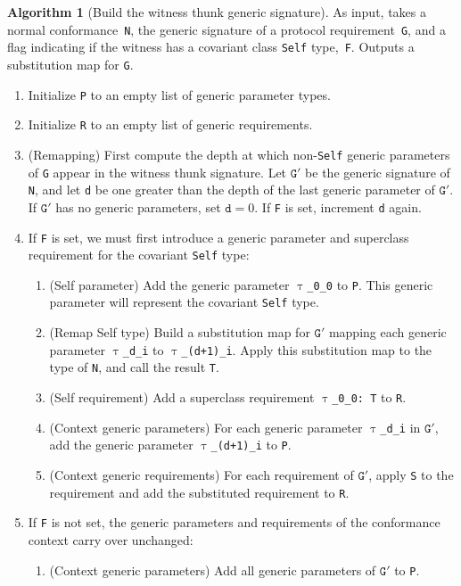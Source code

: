\documentclass[a4paper,headsepline,bibliography=totoc,toc=flat,fleqn,twoside=semi]{scrbook}
\theoremstyle{definition}
\theoremstyle{definition}
\theoremstyle{definition}
\newtheorem{algorithm}{Algorithm}[chapter]
\newcommand{\ttgp}[2]{\texttt{$\uptau$\_#1\_#2}}
\begin{document}
\begin{algorithm}[Build the witness thunk generic signature] As input, takes a normal conformance~\texttt{N}, the generic signature of a protocol requirement~\texttt{G}, and a flag indicating if the witness has a covariant class \texttt{Self} type,~\texttt{F}. Outputs a substitution map for \texttt{G}.
\begin{enumerate}
\item Initialize \texttt{P} to an empty list of generic parameter types.
\item Initialize \texttt{R} to an empty list of generic requirements.
\item (Remapping) First compute the depth at which non-\texttt{Self} generic parameters of \texttt{G} appear in the witness thunk signature. Let $\texttt{G}'$ be the generic signature of \texttt{N}, and let \texttt{d} be one greater than the depth of the last generic parameter of $\texttt{G}'$. If $\texttt{G}'$ has no generic parameters, set $\texttt{d}=0$. If \texttt{F} is set, increment \texttt{d} again.
\item If \texttt{F} is set, we must first introduce a generic parameter and superclass requirement for the covariant \texttt{Self} type:
\begin{enumerate}
\item (Self parameter) Add the generic parameter \ttgp{0}{0} to \texttt{P}. This generic parameter will represent the covariant \texttt{Self} type.
\item (Remap Self type) Build a substitution map for $\texttt{G}'$ mapping each generic parameter \ttgp{d}{i} to \ttgp{(d+1)}{i}. Apply this substitution map to the type of \texttt{N}, and call the result \texttt{T}.
\item (Self requirement) Add a superclass requirement \texttt{\ttgp{0}{0}:\ T} to \texttt{R}.
\item (Context generic parameters) For each generic parameter \ttgp{d}{i} in $\texttt{G}'$, add the generic parameter \ttgp{(d+1)}{i} to \texttt{P}.
\item (Context generic requirements) For each requirement of $\texttt{G}'$, apply \texttt{S} to the requirement and add the substituted requirement to \texttt{R}.
\end{enumerate}
\item If \texttt{F} is not set, the generic parameters and requirements of the conformance context carry over unchanged:
\begin{enumerate}
\item (Context generic parameters) Add all generic parameters of $\texttt{G}'$ to \texttt{P}.

\end{enumerate}
\end{enumerate}
\end{algorithm}
\end{document}
